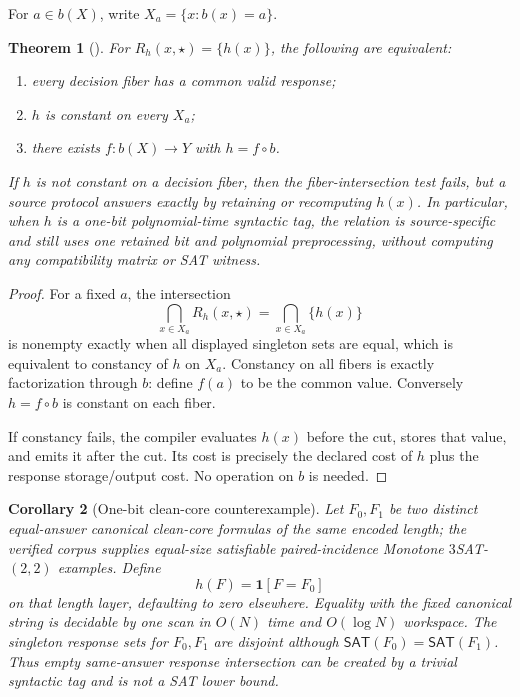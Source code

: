 \documentclass[11pt]{article}
\newcommand{\SAT}{\mathsf{SAT}}
\newcommand{\claim}[1]{\texttt{\detokenize{#1}}}
\newtheorem{theorem}{Theorem}
\newtheorem{corollary}[theorem]{Corollary}
\begin{document}
For $a\in b(X)$, write $X_a=\{x:b(x)=a\}$.

\begin{theorem}[\claim{SOURCE-SPECIFICITY-NO-HARDNESS1}]
For $R_h(x,\star)=\{h(x)\}$, the following are equivalent:
\begin{enumerate}[label=(\roman*)]
\item every decision fiber has a common valid response;
\item $h$ is constant on every $X_a$;
\item there exists $f:b(X)\to Y$ with $h=f\circ b$.
\end{enumerate}
If $h$ is not constant on a decision fiber, then the fiber-intersection test
fails, but a source protocol answers exactly by retaining or recomputing
$h(x)$.  In particular, when $h$ is a one-bit polynomial-time syntactic tag,
the relation is source-specific and still uses one retained bit and
polynomial preprocessing, without computing any compatibility matrix or SAT
witness.
\end{theorem}

\begin{proof}
For a fixed $a$, the intersection
\[
 \bigcap_{x\in X_a}R_h(x,\star)
 =\bigcap_{x\in X_a}\{h(x)\}
\]
is nonempty exactly when all displayed singleton sets are equal, which is
equivalent to constancy of $h$ on $X_a$.  Constancy on all fibers is exactly
factorization through $b$: define $f(a)$ to be the common value.  Conversely
$h=f\circ b$ is constant on each fiber.

If constancy fails, the compiler evaluates $h(x)$ before the cut, stores that
value, and emits it after the cut.  Its cost is precisely the declared cost
of $h$ plus the response storage/output cost.  No operation on $b$ is needed.
\end{proof}

\begin{corollary}[One-bit clean-core counterexample]
Let $F_0,F_1$ be two distinct equal-answer canonical clean-core formulas of
the same encoded length; the verified corpus supplies equal-size satisfiable
paired-incidence Monotone $3$SAT-$(2,2)$ examples.  Define
\[
 h(F)=\mathbf 1[F=F_0]
\]
on that length layer, defaulting to zero elsewhere.  Equality with the fixed
canonical string is decidable by one scan in $O(N)$ time and $O(\log N)$
workspace.  The singleton response sets for $F_0,F_1$ are disjoint although
$\SAT(F_0)=\SAT(F_1)$.  Thus empty same-answer response intersection can be
created by a trivial syntactic tag and is not a SAT lower bound.
\end{corollary}
\end{document}

